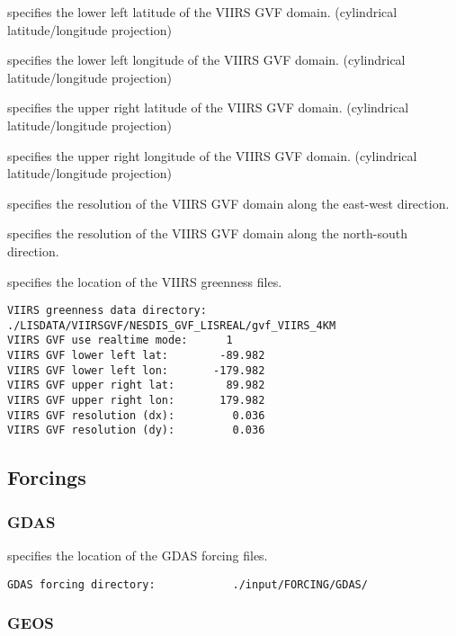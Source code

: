   specifies the lower left latitude
 of the VIIRS GVF domain.
 (cylindrical latitude/longitude projection)

  specifies the lower left
 longitude of the VIIRS GVF domain.
 (cylindrical latitude/longitude projection)

  specifies the upper right latitude
 of the VIIRS GVF domain.
 (cylindrical latitude/longitude projection)

  specifies the upper right
 longitude of the VIIRS GVF domain.
 (cylindrical latitude/longitude projection)

  specifies the resolution of the 
 VIIRS GVF domain along the east-west direction.

  specifies the resolution of the 
 VIIRS GVF domain along the north-south direction.

  specifies the location of
 the VIIRS greenness files.
 

 \begin{Verbatim}[frame=single]
VIIRS greenness data directory:  ./LISDATA/VIIRSGVF/NESDIS_GVF_LISREAL/gvf_VIIRS_4KM
VIIRS GVF use realtime mode:      1
VIIRS GVF lower left lat:        -89.982
VIIRS GVF lower left lon:       -179.982
VIIRS GVF upper right lat:        89.982
VIIRS GVF upper right lon:       179.982
VIIRS GVF resolution (dx):         0.036
VIIRS GVF resolution (dy):         0.036
 \end{Verbatim}

 
 \subsection{Forcings} \label{ssec:forcings}
 

 
 \subsubsection{GDAS} \label{sssec:forcings_gdas}
  specifies the location of the GDAS
 forcing files.
 

 \begin{Verbatim}[frame=single]
GDAS forcing directory:            ./input/FORCING/GDAS/
 \end{Verbatim}

 
 \subsubsection{GEOS} \label{sssec:forcings_geos}
 

